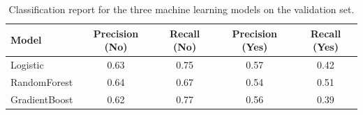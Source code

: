 
\begin{table}[ht]
\centering
\caption{Classification report for the three machine learning models on the validation set.}
\label{tab:classification_report}
\begin{tabular}{lcccc}
\toprule
\textbf{Model} & \textbf{Precision (No)} & \textbf{Recall (No)} & \textbf{Precision (Yes)} & \textbf{Recall (Yes)} \\
\midrule
Logistic & 0.63 & 0.75 & 0.57 & 0.42 \\
RandomForest & 0.64 & 0.67 & 0.54 & 0.51 \\
GradientBoost & 0.62 & 0.77 & 0.56 & 0.39 \\

\bottomrule
\end{tabular}
\end{table}
